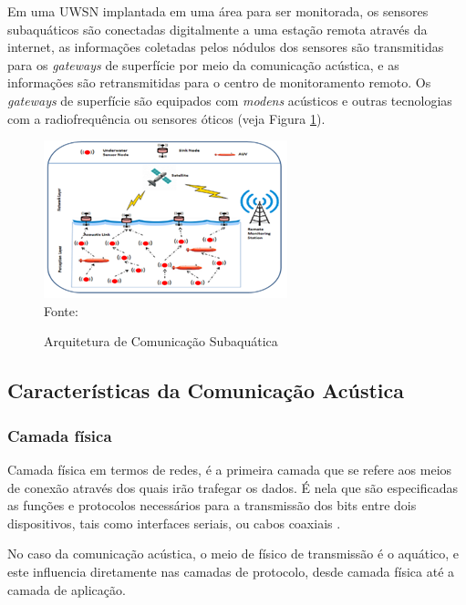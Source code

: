 Em uma UWSN implantada em uma área para ser monitorada, os sensores subaquáticos são conectadas digitalmente a uma estação remota através da internet, as informações coletadas pelos nódulos dos sensores são transmitidas para os \textit{gateways} de superfície por meio da comunicação acústica, e as informações são retransmitidas para o centro de monitoramento remoto. Os \textit{gateways} de superfície são equipados com \textit{modens} acústicos e outras tecnologias com a radiofrequência ou sensores óticos (veja Figura \ref{fig:arquitetura-comunicacao}).

\begin{figure}[h]
	\centering
	\caption[Arquitetura de Comunicação Subaquática]{Arquitetura de Comunicação Subaquática}
	\label{fig:arquitetura-comunicacao}
	\includegraphics[width=0.5\linewidth]{images/arquitetura-comunicacao}\\
	\footnotesize Fonte: \cite{godi2021survey}
\end{figure}

\subsection{Características da Comunicação Acústica}
\label{subsec:caracteristicas-da-comunicacao-acustica}

\subsubsection*{Camada física}

Camada física em termos de redes, é a primeira camada que se refere aos meios de conexão através dos quais irão trafegar os dados. É nela que são especificadas as funções e protocolos necessários para a transmissão dos bits entre dois dispositivos, tais como interfaces seriais, ou cabos coaxiais \cite{Wikipedia}.

No caso da comunicação acústica, o meio de físico de transmissão é o aquático, e este influencia diretamente nas camadas de protocolo, desde camada física até a camada de aplicação.

